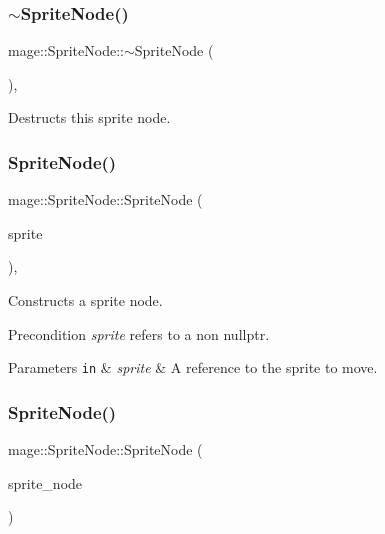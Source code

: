 \subsubsection{\texorpdfstring{$\sim$\+Sprite\+Node()}{~SpriteNode()}}
{\footnotesize\ttfamily mage\+::\+Sprite\+Node\+::$\sim$\+Sprite\+Node (\begin{DoxyParamCaption}{ }\end{DoxyParamCaption})\hspace{0.3cm}{\ttfamily [virtual]}, {\ttfamily [default]}}

Destructs this sprite node. \hypertarget{classmage_1_1_sprite_node_a6c1cbe186a3537ab5725ad53d6f8deb3}{}\label{classmage_1_1_sprite_node_a6c1cbe186a3537ab5725ad53d6f8deb3} 
\subsubsection{\texorpdfstring{Sprite\+Node()}{SpriteNode()}\hspace{0.1cm}{\footnotesize\ttfamily [1/3]}}
{\footnotesize\ttfamily mage\+::\+Sprite\+Node\+::\+Sprite\+Node (\begin{DoxyParamCaption}\item[{\hyperlink{namespacemage_a3316d7143a973e37adf1110f2e80ca31}{Unique\+Ptr}$<$ \hyperlink{classmage_1_1_sprite}{Sprite} $>$ \&\&}]{sprite }\end{DoxyParamCaption})\hspace{0.3cm}{\ttfamily [explicit]}, {\ttfamily [protected]}}

Constructs a sprite node.

\begin{DoxyPrecond}{Precondition}
{\itshape sprite} refers to a non {\ttfamily nullptr}. 
\end{DoxyPrecond}

\begin{DoxyParams}[1]{Parameters}
\mbox{\tt in}  & {\em sprite} & A reference to the sprite to move. \\
\hline
\end{DoxyParams}
\hypertarget{classmage_1_1_sprite_node_a5744942fd29d59c34820d9bb3bdd17b7}{}\label{classmage_1_1_sprite_node_a5744942fd29d59c34820d9bb3bdd17b7} 
\subsubsection{\texorpdfstring{Sprite\+Node()}{SpriteNode()}\hspace{0.1cm}{\footnotesize\ttfamily [2/3]}}
{\footnotesize\ttfamily mage\+::\+Sprite\+Node\+::\+Sprite\+Node (\begin{DoxyParamCaption}\item[{const \hyperlink{classmage_1_1_sprite_node}{Sprite\+Node} \&}]{sprite\+\_\+node }\end{DoxyParamCaption})\hspace{0.3cm}{\ttfamily [protected]}}

